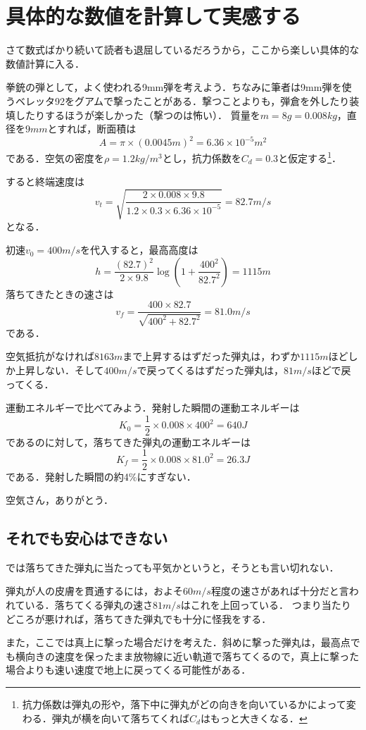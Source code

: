 \documentclass[a4paper,12pt]{jarticle}
\theoremstyle{definition}%
\begin{document}
\section{具体的な数値を計算して実感する}


さて数式ばかり続いて読者も退屈しているだろうから，ここから楽しい具体的な数値計算に入る．

拳銃の弾として，よく使われる9mm弾を考えよう．ちなみに筆者は9mm弾を使うベレッタ92をグアムで撃ったことがある．撃つことよりも，弾倉を外したり装填したりするほうが楽しかった（撃つのは怖い）．
質量を$m=8g=0.008kg$，直径を$9mm$とすれば，断面積は
\[
A=\pi\times(0.0045m)^2=6.36\times10^{-5}m^2
\]
である．空気の密度を$\rho=1.2kg/m^3$とし，抗力係数を$C_d=0.3$と仮定する\footnote{抗力係数は弾丸の形や，落下中に弾丸がどの向きを向いているかによって変わる．弾丸が横を向いて落ちてくれば$C_d$はもっと大きくなる．}．

すると終端速度は
\[
v_t=\sqrt{\frac{2\times0.008\times9.8}{1.2\times0.3\times6.36\times10^{-5}}}=82.7m/s
\]
となる．

初速$v_0=400m/s$を代入すると，最高高度は
\[
h=\frac{(82.7)^2}{2\times9.8}\log\left(1+\frac{400^2}{82.7^2}\right)=1115m
\]
落ちてきたときの速さは
\[
v_f=\frac{400\times82.7}{\sqrt{400^2+82.7^2}}=81.0m/s
\]
である．

空気抵抗がなければ$8163m$まで上昇するはずだった弾丸は，わずか$1115m$ほどしか上昇しない．そして$400m/s$で戻ってくるはずだった弾丸は，$81m/s$ほどで戻ってくる．

運動エネルギーで比べてみよう．発射した瞬間の運動エネルギーは
\[
K_0=\frac{1}{2}\times0.008\times400^2=640J
\]
であるのに対して，落ちてきた弾丸の運動エネルギーは
\[
K_f=\frac{1}{2}\times0.008\times81.0^2=26.3J
\]
である．発射した瞬間の約4\%にすぎない．

空気さん，ありがとう．

\subsection{それでも安心はできない}

では落ちてきた弾丸に当たっても平気かというと，そうとも言い切れない．

弾丸が人の皮膚を貫通するには，およそ$60m/s$程度の速さがあれば十分だと言われている．落ちてくる弾丸の速さ$81m/s$はこれを上回っている．
つまり当たりどころが悪ければ，落ちてきた弾丸でも十分に怪我をする．

また，ここでは真上に撃った場合だけを考えた．斜めに撃った弾丸は，最高点でも横向きの速度を保ったまま放物線に近い軌道で落ちてくるので，真上に撃った場合よりも速い速度で地上に戻ってくる可能性がある．
\end{document}

